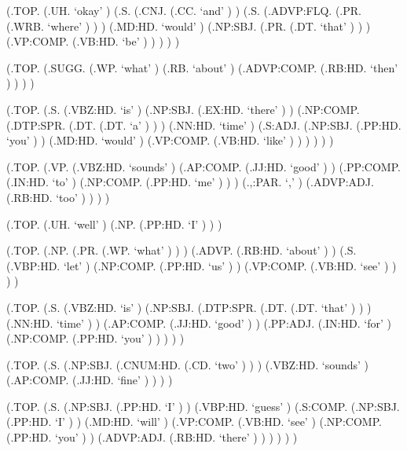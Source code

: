 \documentclass[10pt]{article}
\begin{document}
\begin{parsetree}  (.TOP. (.UH. `okay' ) (.S. (.CNJ. (.CC. `and' ) ) (.S. (.ADVP:FLQ. (.PR. (.WRB. `where' ) ) ) (.MD:HD. `would' ) (.NP:SBJ. (.PR. (.DT. `that' ) ) ) (.VP:COMP. (.VB:HD. `be' ) ) ) ) ) \end{parsetree}

\begin{parsetree}  (.TOP. (.SUGG. (.WP. `what' ) (.RB. `about' ) (.ADVP:COMP. (.RB:HD. `then' ) ) ) ) \end{parsetree}

\begin{parsetree}  (.TOP. (.S. (.VBZ:HD. `is' ) (.NP:SBJ. (.EX:HD. `there' ) ) (.NP:COMP. (.DTP:SPR. (.DT. (.DT. `a' ) ) ) (.NN:HD. `time' ) (.S:ADJ. (.NP:SBJ. (.PP:HD. `you' ) ) (.MD:HD. `would' ) (.VP:COMP. (.VB:HD. `like' ) ) ) ) ) ) \end{parsetree}

\begin{parsetree}  (.TOP. (.VP. (.VBZ:HD. `sounds' ) (.AP:COMP. (.JJ:HD. `good' ) ) (.PP:COMP. (.IN:HD. `to' ) (.NP:COMP. (.PP:HD. `me' ) ) ) (.,:PAR. `,' ) (.ADVP:ADJ. (.RB:HD. `too' ) ) ) ) \end{parsetree}

\begin{parsetree}  (.TOP. (.UH. `well' ) (.NP. (.PP:HD. `I' ) ) ) \end{parsetree}

\begin{parsetree}  (.TOP. (.NP. (.PR. (.WP. `what' ) ) ) (.ADVP. (.RB:HD. `about' ) ) (.S. (.VBP:HD. `let' ) (.NP:COMP. (.PP:HD. `us' ) ) (.VP:COMP. (.VB:HD. `see' ) ) ) ) \end{parsetree}

\begin{parsetree}  (.TOP. (.S. (.VBZ:HD. `is' ) (.NP:SBJ. (.DTP:SPR. (.DT. (.DT. `that' ) ) ) (.NN:HD. `time' ) ) (.AP:COMP. (.JJ:HD. `good' ) ) (.PP:ADJ. (.IN:HD. `for' ) (.NP:COMP. (.PP:HD. `you' ) ) ) ) ) \end{parsetree}

\begin{parsetree}  (.TOP. (.S. (.NP:SBJ. (.CNUM:HD. (.CD. `two' ) ) ) (.VBZ:HD. `sounds' ) (.AP:COMP. (.JJ:HD. `fine' ) ) ) ) \end{parsetree}

\begin{parsetree}  (.TOP. (.S. (.NP:SBJ. (.PP:HD. `I' ) ) (.VBP:HD. `guess' ) (.S:COMP. (.NP:SBJ. (.PP:HD. `I' ) ) (.MD:HD. `will' ) (.VP:COMP. (.VB:HD. `see' ) (.NP:COMP. (.PP:HD. `you' ) ) (.ADVP:ADJ. (.RB:HD. `there' ) ) ) ) ) ) \end{parsetree}
\end{document}
